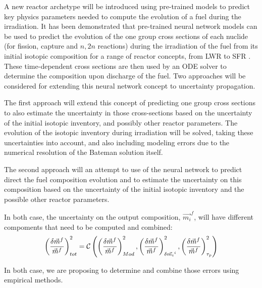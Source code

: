 \documentclass[dvips,12pt]{article}
\begin{document}
A new reactor archetype will be introduced 
using pre-trained
models to predict key physics
parameters needed to compute the evolution of a
fuel during the irradiation. It has been demonstrated
that pre-trained neural network models can be
used to predict the evolution of the one group cross
sections of each nuclide (for fission, capture and
$n,2n$ reactions) during the irradiation of the
fuel from its initial isotopic composition for a
range of reactor concepts, from LWR to SFR
\cite{Leniau Neural networks, Leniau.PHYSOR.2016}.
These time-dependent cross sections are then used
by an ODE solver to determine the composition
upon discharge of the fuel. Two approaches will 
be considered for extending this neural network 
concept to uncertainty propagation.


The first approach will extend this concept of
predicting one group cross sections to also
estimate the uncertainty in those cross-sections
based on the uncertainty of the initial isotopic
inventory, and possibly other reactor parameters.
The evolution of the isotopic inventory during
irradiation will be solved, taking these
uncertainties into account, and also including
modeling errors due to the numerical resolution of
the Bateman solution itself.

The second approach will an attempt to use of the
neural network to predict direct the fuel
composition evolution and to estimate the
uncertainty on this composition based on the
uncertainty of the initial isotopic inventory and
the possible other reactor parameters.

In both case, the uncertainty on the output
composition, $\vec{m_i}^{f}$, will have different
compoments that need to be computed and combined:
\begin{equation}
  \left( \frac{\delta \vec{m}^{f}}{\vec{m}^{f}} \right)^{2} _{tot} =
  {\cal C}\left(  \left( \frac{\delta \vec{m}^{f}}{\vec{m}^{f}} \right)^{2} _{Mod},
                  \left( \frac{\delta \vec{m}^{f}}{\vec{m}^{f}} \right)^{2} _{\delta \vec{m_i}^{i} },
                  \left( \frac{\delta \vec{m}^{f}}{\vec{m}^{f}} \right)^{2} _{\tau_p} \right)
\end{equation}

In both case, we are proposing to determine and
combine those errors using empirical methods.
\end{document}
